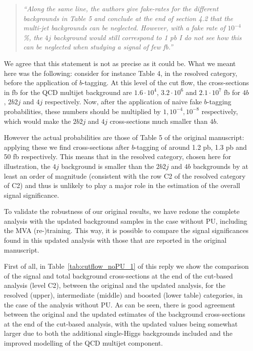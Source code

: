 \documentclass[11pt,a4paper]{article}
\begin{document}
\begin{itemize}
   \begin{quote}
     \it ``Along the same line, the authors give fake-rates for the different backgrounds in Table 5 and conclude at the end of section 4.2 that the multi-jet backgrounds can be neglected. However, with a fake rate of
     $10^{-4}$ \%, the $4j$ background would still correspond to 1 pb I do not see how this can be neglected when studying a signal of few fb.''
   \end{quote}

   We agree that this statement is not as precise as it could be.
   What we meant here was the following: consider for instance Table 4, in the resolved category,
   before the application of $b$-tagging.
   At this level of the cut flow,
   the cross-sections in fb for the QCD multijet background are
   $1.6\cdot 10^4$, $3.2\cdot 10^6$ and $2.1\cdot 10^7$ fb for $4b$, $2b2j$ and $4j$
   respectively.
   Now, after the application of naive fake $b$-tagging probabilities, these numbers
   should be multiplied by $1,10^{-4},10^{-8}$ respectively, which would make
   the $2b2j$ and $4j$ cross-sections
   much smaller than $4b$.

  
   However the actual probabilities are those of Table 5 of the
   original manuscript: applying these
   we find cross-sections after $b$-tagging of around 1.2 pb, 1.3 pb and 50 fb respectively.
   This means that in the resolved category, chosen here for illustration, the $4j$ background
   is smaller than the $2b2j$ and $4b$ backgrounds by at least an order of magnitude (consistent
   with the row C2 of the resolved category of C2) and thus is unlikely to play a major
   role in the estimation of the overall signal significance.
  
\end{itemize}


To validate the robustness of our original results, 
we have redone the complete analysis with the updated background samples
in the case without PU, including
the MVA (re-)training.
%
This way, it is possible to compare the signal significances found
in this updated analysis with those that are reported in the original manuscript.

  First of all, in Table~\ref{tab:cutflow_noPU_1} of this reply
  we show the comparison of the signal and total background
      cross-sections at the end of the cut-based analysis (level C2),
      between the original and the updated analysis,  for the resolved (upper),
      intermediate (middle) and boosted
      (lower table) categories, in the case of the analysis
      without PU.
      As can be seen, there is good agreement between the original and the updated
      estimates of the background cross-sections at the end of the cut-based analysis,
      with the updated values being somewhat larger due to both the additional single-Higgs
      backgrounds included and the improved modelling of the QCD multijet component.
\end{document}
